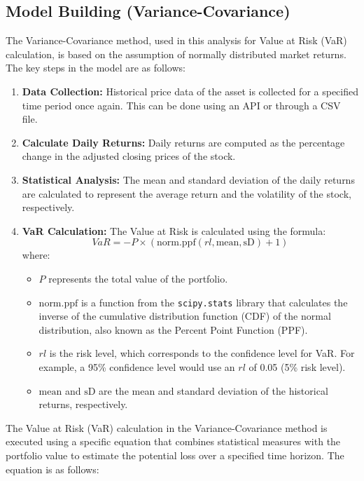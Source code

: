 \documentclass{article}
\begin{document}
\subsection{Model Building (Variance-Covariance)}

The Variance-Covariance method, used in this analysis for Value at Risk (VaR) calculation, is based on the assumption of normally distributed market returns. The key steps in the model are as follows:

\begin{enumerate}
    \item \textbf{Data Collection:} Historical price data of the asset is collected for a specified time period once again. This can be done using an API or through a CSV file.
    \item \textbf{Calculate Daily Returns:} Daily returns are computed as the percentage change in the adjusted closing prices of the stock.
    \item \textbf{Statistical Analysis:} The mean and standard deviation of the daily returns are calculated to represent the average return and the volatility of the stock, respectively.
    \item \textbf{VaR Calculation:} The Value at Risk is calculated using the formula:
    \begin{equation}
      VaR = - P \times (\text{norm.ppf}(rl, \text{mean}, \text{sD}) + 1) 
      \label{eq:Variance-Covariance VaR}
    \end{equation}
    where:
\begin{itemize}
    \item \( P \) represents the total value of the portfolio.
    \item \( \text{norm.ppf} \) is a function from the \texttt{scipy.stats} library that calculates the inverse of the cumulative distribution function (CDF) of the normal distribution, also known as the Percent Point Function (PPF).
    \item \( rl \) is the risk level, which corresponds to the confidence level for VaR. For example, a 95\% confidence level would use an \( rl \) of 0.05 (5\% risk level).
    \item \( \text{mean} \) and \( \text{sD} \) are the mean and standard deviation of the historical returns, respectively.
\end{itemize}
\end{enumerate}

\newpage
The Value at Risk (VaR) calculation in the Variance-Covariance method is executed using a specific equation that combines statistical measures with the portfolio value to estimate the potential loss over a specified time horizon. The equation is as follows:
\end{document}
